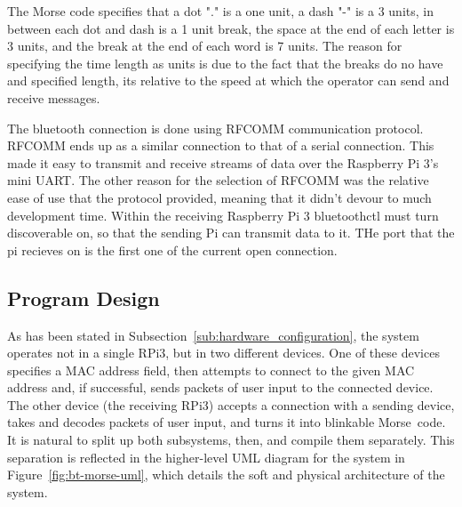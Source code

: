 \documentclass[11pt]{article}
\begin{document}
The Morse code specifies that a dot "." is a one unit, a dash "-" is a 3 units, in between each dot and dash is a 1 unit break, the space at the end of each letter is 3 units, and the break at the end of each word is 7 units.
The reason for specifying the time length as units is due to the fact that the breaks do no have and specified length, its relative to the speed at which the operator can send and receive messages.


The bluetooth connection is done using RFCOMM communication protocol.
RFCOMM ends up as a similar connection to that of a serial connection.
This made it easy to transmit and receive streams of data over the Raspberry Pi 3's mini UART.
The other reason for the selection of RFCOMM was the relative ease of use that the protocol provided, meaning that it didn't devour to much development time.
Within the receiving Raspberry Pi 3 bluetoothctl must turn discoverable on, so that the sending Pi can transmit data to it.
THe port that the pi recieves on is the first one of the current open connection.




\subsection{Program Design}
\label{sub:program_design}






As has been stated in Subsection~\ref{sub:hardware_configuration}, the system operates not in a single RPi3, but in two different devices.
One of these devices specifies a MAC address field, then attempts to connect to the given MAC address and, if successful, sends packets of user input to the connected device.
The other device (the receiving RPi3) accepts a connection with a sending device, takes and decodes packets of user input, and turns it into blinkable Morse~code.
It is natural to split up both subsystems, then, and compile them separately.
This separation is reflected in the higher-level UML diagram for the system in Figure~\ref{fig:bt-morse-uml}, which details the soft and physical architecture of the system.
\end{document}
